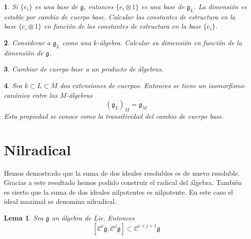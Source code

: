 \documentclass[a4paper,draft,12pt]{article}
\newtheorem{lema}[teo]{Lema}%
\newtheorem{pro1}{}%
\newenvironment{pro}{\begin{pro1} \rm} {\end{pro1}}
\newcommand{\central}{\mathcal{C}}%
\newcommand{\df}[1]{\textsf{\color{blue}#1}}
\begin{document}
\begin{pro}

Si $\{e_i\}$ es una base de $\mathfrak{g}$, entonces $\{e_i \otimes 1\}$ es una base de $\mathfrak{g}_L$. La dimensión es estable por cambio de cuerpo base.  Calcular las constantes de estructura en la base $\{e_i \otimes 1\}$ en función de las constantes de estructura en la base $\{e_i\}$.

\end{pro}

\begin{pro}

Considerar a $\mathfrak{g}_L$ como una $k$-álgebra.  Calcular su dimensión en función de la dimensión de $\mathfrak{g}$.

\end{pro}

\begin{pro}

Cambiar de cuerpo base a un producto de álgebras.

\end{pro}

\begin{pro}

Sea $k \subset L \subset M$ dos extensiones de cuerpos. Entonces se tiene un isomorfismo canónico entre las $M$-álgebras
$$
(\mathfrak{g}_L)_M = \mathfrak{g}_M
$$
Esta propiedad se conoce como la  \df{transitividad} del cambio de cuerpo base.

\end{pro}

\newpage

\section{Nilradical}

Hemos demostrado que la suma de dos ideales resolubles es de nuevo resoluble.  Gracias a este resultado hemos podido construir el radical del álgebra.  También es cierto que la suma de dos ideales nilpotentes es nilpotente.  En este caso el ideal maximal se denomina   \df{nilradical}.

\begin{lema}

Sea $\mathfrak{g}$ un álgebra de Lie.  Entonces
$$
[\central^i\mathfrak{g}, \central^j \mathfrak{g}]\subset \central^{i+j+1}\mathfrak{g}
$$

\end{lema}
\end{document}

